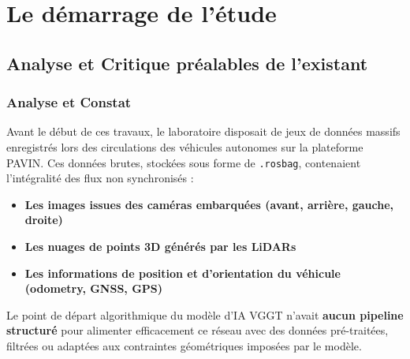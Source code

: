\documentclass[12pt,a4paper,oneside]{report}
\begin{document}
\newpage

\chapter{Le démarrage de l'étude}

\section{Analyse et Critique préalables de l'existant}
\subsection{Analyse et Constat}
\vspace{0.5cm}
\hspace*{1em}Avant le début de ces travaux, le laboratoire disposait de jeux de données massifs enregistrés lors des circulations des véhicules autonomes sur la plateforme PAVIN. Ces données brutes, stockées sous forme de \texttt{.rosbag}, contenaient l'intégralité des flux non synchronisés : 
\vspace{.5cm}
\begin{itemize}
    \setlength{\itemsep}{1em}
    \renewcommand{\labelitemi}{{\large\bfseries\textbullet}}
    \item {\bfseries Les images issues des caméras embarquées (avant, arrière, gauche, droite)}
    \item {\bfseries Les nuages de points 3D générés par les LiDARs}
    \item {\bfseries Les informations de position et d'orientation du véhicule (odometry, GNSS, GPS)}
\end{itemize}
\bigskip
\hspace*{.5cm}Le point de départ algorithmique du modèle d'IA VGGT n'avait \textbf{aucun pipeline structuré} pour alimenter efficacement ce réseau avec des données pré-traitées, filtrées ou adaptées aux contraintes géométriques imposées par le modèle.
\end{document}
